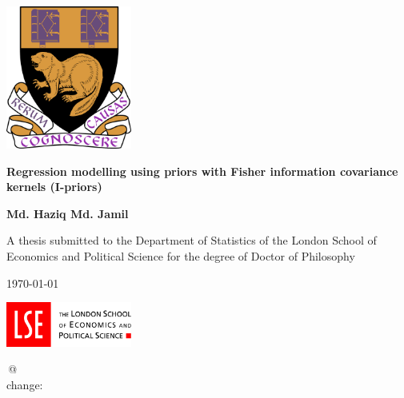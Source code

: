 \documentclass[11pt,twoside,openright,showframe]{report}
\begin{document}
\begin{titlepage}
  \singlespacing
  \begin{center}
    
    \vspace*{6.25mm}
     
    \includegraphics[width=0.31\textwidth]{figure/lse_coat_of_arms_1024}
    \vspace{15.2mm}
    
    \LARGE
    {\textbf{Regression modelling using priors with Fisher information covariance kernels (I-priors)}}
    \vspace{12.16mm}  %
    
    \Large 
    \textbf{Md. Haziq Md. Jamil}
    \vfill
    
    \normalsize
    A thesis submitted to the Department of Statistics of the London School of Economics and Political Science for the degree of Doctor of Philosophy
    \vspace{1cm}
    
    \UKvardate
    \today
    \vspace{1cm}
    
    \includegraphics[width=0.31\textwidth]{figure/lse_logo_1024}
  
  \end{center}
\end{titlepage}

\begin{center}
  \thispagestyle{empty}
  \vspace*{1cm}
  
  \vfill
  
  \begingroup
    \singlespacing
    \color{gray}
    \ttfamily 
    [git]\;\gitBranch\,@\,\gitAbbrevHash{} \\[-0.3em]
    change:\;\gitAuthorIsoDate
  \endgroup
\end{center}
\end{document}
